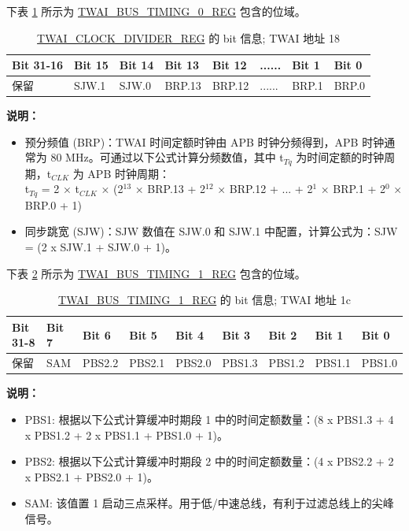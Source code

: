 \documentclass[main\_\_CN.tex]{subfiles}
\begin{document}
下表 \ref{table:Bit_timing_0} 所示为 \hyperref[regdesc:TWAIBUSTIMING0REG]{TWAI\_BUS\_TIMING\_0\_REG} 包含的位域。

\begin{longtable}[c]{|p{2cm}|p{1.5cm}|p{1.5cm}|p{1.5cm}|p{1.5cm}|p{1.5cm}|p{1.5cm}|p{1.5cm}|}
\caption{\hyperref[regdesc:TWAICLOCKDIVIDERREG]{TWAI\_CLOCK\_DIVIDER\_REG} 的 bit 信息; TWAI 地址 \hexprefix{}18}
\label{table:Bit_timing_0}\\\hline
\rowcolor{lightgray}
  Bit 31-16 & Bit 15 & Bit 14 & Bit 13 & Bit 12 & ...... & Bit 1 & Bit 0\\\hline
  保留& SJW.1 & SJW.0 & BRP.13 & BRP.12 & ...... & BRP.1 & BRP.0\\\hline
\end{longtable}
\vspace{-1.5em}
{\bfseries 说明：}\\
\begin{itemize}
    \item 预分频值 (BRP)：TWAI 时间定额时钟由 APB 时钟分频得到，APB 时钟通常为 80 MHz。可通过以下公式计算分频数值，其中 t$_{Tq}$ 为时间定额的时钟周期，t$_{CLK}$ 为 APB 时钟周期：\\

t$_{Tq}$ = 2 × t$_{CLK}$ × (2$^{13}$ × BRP.13 + 2$^{12}$ × BRP.12 + ... + 2$^1$ × BRP.1 + 2$^0$ × BRP.0 + 1)
    \item 同步跳宽 (SJW)：SJW 数值在 SJW.0 和 SJW.1 中配置，计算公式为：SJW = (2 x SJW.1 + SJW.0 + 1)。
\end{itemize}

下表 \ref{table:Bit_timing_1} 所示为 \hyperref[regdesc:TWAIBUSTIMING1REG]{TWAI\_BUS\_TIMING\_1\_REG} 包含的位域。

\begin{longtable}[c]{|p{1.4cm}|p{1.4cm}|p{1.4cm}|p{1.4cm}|p{1.4cm}|p{1.4cm}|p{1.4cm}|p{1.4cm}|p{1.4cm}|}
    \caption{\hyperref[regdesc:TWAIBUSTIMING1REG]{TWAI\_BUS\_TIMING\_1\_REG} 的 bit 信息; TWAI 地址 \hexprefix{}1c}
    \label{table:Bit_timing_1}\\
    \hline
       \rowcolor{lightgray}
   Bit 31-8 & Bit 7 & Bit 6 & Bit 5 & Bit 4 & Bit 3 & Bit 2 & Bit 1 & Bit 0\\\hline
   保留 & SAM & PBS2.2 & PBS2.1 & PBS2.0 & PBS1.3 &PBS1.2 & PBS1.1 & PBS1.0\\
    \hline
\end{longtable}
\vspace{-1.5em}
{\bfseries 说明：}\\
\begin{itemize}
    \item PBS1: 根据以下公式计算缓冲时期段 1 中的时间定额数量：(8 x PBS1.3 + 4 x PBS1.2 + 2 x PBS1.1 + PBS1.0 + 1)。
    \item PBS2: 根据以下公式计算缓冲时期段 2 中的时间定额数量：(4 x PBS2.2 + 2 x PBS2.1 + PBS2.0 + 1)。
    \item SAM: 该值置 1 启动三点采样。用于低/中速总线，有利于过滤总线上的尖峰信号。
\end{itemize}
\end{document}
